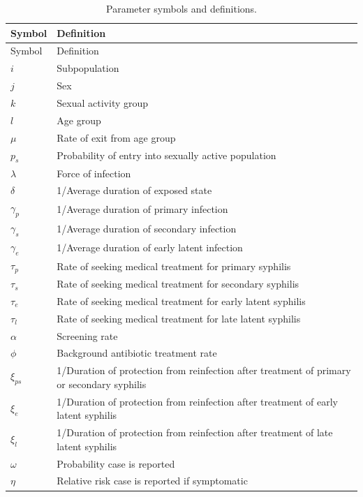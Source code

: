 \documentclass[a4paper]{article}
\begin{document}
\begin{longtable}[l]   {p{1.5cm}p{9cm}}
    \caption{Parameter symbols and definitions. \label{params}}\\
    \hline
    Symbol & Definition\\
	\hline
    \endfirsthead
    
    \hline
    Symbol & Definition\\
	\hline
    \endhead
    
    \hline
    \endfoot
    
    \hline
    \endlastfoot
    
    $i$	& Subpopulation\\
    $j$	& Sex\\
    $k$	& Sexual activity group\\
    $l$	& Age group\\
    $\mu$ & Rate of exit from age group\\
    $p_s$ & Probability of entry into sexually active population\\
    $\lambda$ & Force of infection\\
    $\delta$ & 1/Average duration of exposed state\\
    $\gamma_p$ & 1/Average duration of primary infection\\
    $\gamma_s$ & 1/Average duration of secondary infection\\
    $\gamma_e$ & 1/Average duration of early latent infection\\
    $\tau_p$ & Rate of seeking medical treatment for primary syphilis\\
    $\tau_s$ & Rate of seeking medical treatment for secondary syphilis\\
    $\tau_e$ & Rate of seeking medical treatment for early latent syphilis\\
    $\tau_l$ & Rate of seeking medical treatment for late latent syphilis\\
    $\alpha$ & Screening rate\\
    $\phi$ & Background antibiotic treatment rate\\
    $\xi_{ps}$ & 1/Duration of protection from reinfection after treatment of primary or secondary syphilis\\
    $\xi_{e}$ & 1/Duration of protection from reinfection after treatment of early latent syphilis\\
    $\xi_{l}$ & 1/Duration of protection from reinfection after treatment of late latent syphilis\\
    $\omega$ & Probability case is reported\\
    $\eta$ 	 & Relative risk case is reported if symptomatic\\
	\end{longtable}  
    
\end{document}
